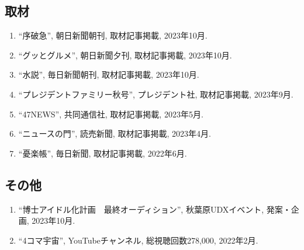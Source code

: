 \documentclass[uplatex, 11pt]{jsarticle}
\begin{document}
\subsection*{取材}
\begin{enumerate}
\item “序破急”, 朝日新聞朝刊, 取材記事掲載, 2023年10月.
\item “グッとグルメ”, 朝日新聞夕刊, 取材記事掲載, 2023年10月.
\item “水説”, 毎日新聞朝刊, 取材記事掲載, 2023年10月.
\item “プレジデントファミリー秋号”, プレジデント社, 取材記事掲載, 2023年9月.
\item “47NEWS”, 共同通信社, 取材記事掲載, 2023年5月.
\item “ニュースの門”, 読売新聞, 取材記事掲載, 2023年4月.
\item “憂楽帳”, 毎日新聞, 取材記事掲載, 2022年6月.
\end{enumerate}
\subsection*{その他}
\begin{enumerate}
\item “博士アイドル化計画　最終オーディション”, 秋葉原UDXイベント, 発案・企画, 2023年10月.
\item “4コマ宇宙”, YouTubeチャンネル, 総視聴回数278,000, 2022年2月.
\end{enumerate}

\end{document}
